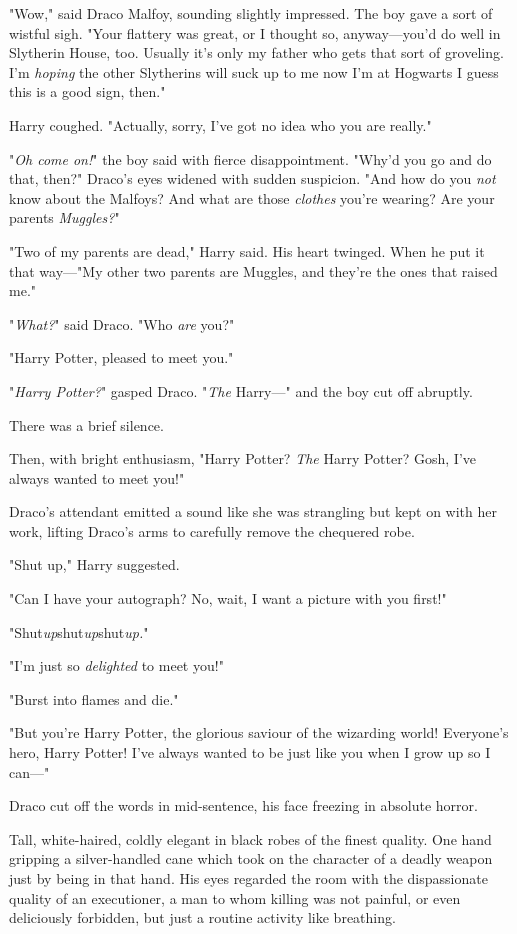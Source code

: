 "Wow," said Draco Malfoy, sounding slightly impressed. The boy gave a sort of
wistful sigh. "Your flattery was great, or I thought so, anyway—you'd do well
in Slytherin House, too. Usually it's only my father who gets that sort of
groveling. I'm \emph{hoping} the other Slytherins will suck up to me now I'm
at Hogwarts{\el} I guess this is a good sign, then."

Harry coughed. "Actually, sorry, I've got no idea who you are really."

"\emph{Oh come on!}" the boy said with fierce disappointment. "Why'd you go and
do that, then?" Draco's eyes widened with sudden suspicion. "And how do you
\emph{not} know about the Malfoys? And what are those \emph{clothes} you're
wearing? Are your parents \emph{Muggles?}"

"Two of my parents are dead," Harry said. His heart twinged. When he put it
that way—"My other two parents are Muggles, and they're the ones that raised
me."

"\emph{What?}" said Draco. "Who \emph{are} you?"

"Harry Potter, pleased to meet you."

"\emph{Harry Potter?}" gasped Draco. "\emph{The} Harry—" and the boy cut off
abruptly.

There was a brief silence.

Then, with bright enthusiasm, "Harry Potter? \emph{The} Harry Potter? Gosh,
I've always wanted to meet you!"

Draco's attendant emitted a sound like she was strangling but kept on with her
work, lifting Draco's arms to carefully remove the chequered robe.

"Shut up," Harry suggested.

"Can I have your autograph? No, wait, I want a picture with you first!"

"Shut\emph{up}shut\emph{up}shut\emph{up.}"

"I'm just so \emph{delighted} to meet you!"

"Burst into flames and die."

"But you're Harry Potter, the glorious saviour of the wizarding world!
Everyone's hero, Harry Potter! I've always wanted to be just like you when I
grow up so I can—"

Draco cut off the words in mid-sentence, his face freezing in absolute horror.

Tall, white-haired, coldly elegant in black robes of the finest quality. One
hand gripping a silver-handled cane which took on the character of a deadly
weapon just by being in that hand. His eyes regarded the room with the
dispassionate quality of an executioner, a man to whom killing was not painful,
or even deliciously forbidden, but just a routine activity like breathing.

